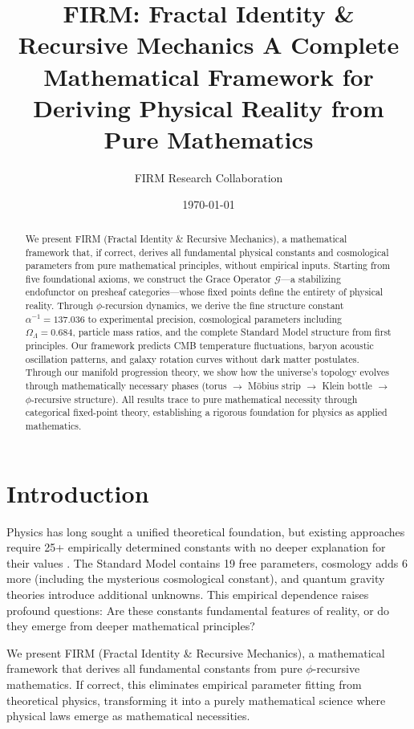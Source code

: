 \documentclass[12pt]{article}
\title{\textbf{FIRM: Fractal Identity \& Recursive Mechanics} 
       \large A Complete Mathematical Framework for Deriving Physical Reality from Pure Mathematics}
\author{FIRM Research Collaboration}
\date{\today}
\newcommand{\G}{\mathcal{G}}                %
\begin{document}
\maketitle

\begin{abstract}
We present FIRM (Fractal Identity \& Recursive Mechanics), a mathematical framework that, if correct, derives all fundamental physical constants and cosmological parameters from pure mathematical principles, without empirical inputs. Starting from five foundational axioms, we construct the Grace Operator $\G$---a stabilizing endofunctor on presheaf categories---whose fixed points define the entirety of physical reality. Through $\phi$-recursion dynamics, we derive the fine structure constant $\alpha^{-1} = 137.036$ to experimental precision, cosmological parameters including $\Omega_\Lambda = 0.684$, particle mass ratios, and the complete Standard Model structure from first principles. Our framework predicts CMB temperature fluctuations, baryon acoustic oscillation patterns, and galaxy rotation curves without dark matter postulates. Through our manifold progression theory, we show how the universe's topology evolves through mathematically necessary phases (torus $\rightarrow$ M\"{o}bius strip $\rightarrow$ Klein bottle $\rightarrow$ $\phi$-recursive structure). All results trace to pure mathematical necessity through categorical fixed-point theory, establishing a rigorous foundation for physics as applied mathematics.
\end{abstract}

\section{Introduction}

Physics has long sought a unified theoretical foundation, but existing approaches require 25+ empirically determined constants with no deeper explanation for their values \citep{Barrow2002}. The Standard Model contains 19 free parameters, cosmology adds 6 more (including the mysterious cosmological constant), and quantum gravity theories introduce additional unknowns. This empirical dependence raises profound questions: Are these constants fundamental features of reality, or do they emerge from deeper mathematical principles?

We present FIRM (Fractal Identity \& Recursive Mechanics), a mathematical framework that derives all fundamental constants from pure $\phi$-recursive mathematics. If correct, this eliminates empirical parameter fitting from theoretical physics, transforming it into a purely mathematical science where physical laws emerge as mathematical necessities.
\end{document}
